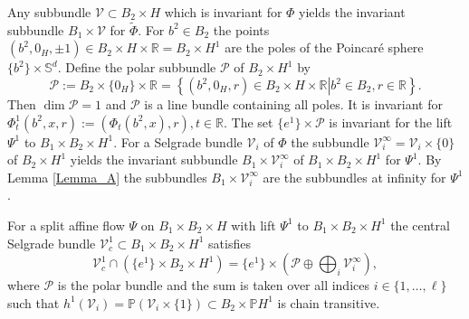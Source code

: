 	Any subbundle $\mathcal{V}\subset B_{2}\times H$ which is invariant for $\Phi$
	yields the invariant subbundle $B_{1}\times\mathcal{V}$ for $\widetilde{\Phi}%
	$. For $b^{2}\in B_{2}$ the points $(b^{2},0_{H},\pm1)\in B_{2}\times
	H\times\mathbb{R}=B_{2}\times H^{1}$ are the poles of the Poincar\'{e} sphere
	$\{b^{2}\}\times\mathbb{S}^{d}$. Define the polar subbundle $\mathcal{P}$ of
	$B_{2}\times H^{1}$ by
	\begin{equation}
		\mathcal{P}:=B_{2}\times\{0_{H}\}\times\mathbb{R}=\left\{  (b^{2},0_{H},r)\in
		B_{2}\times H\times\mathbb{R}\left\vert b^{2}\in B_{2},r\in\mathbb{R}\right.
		\right\}  . \label{P}%
	\end{equation}
	Then $\dim\mathcal{P}=1$ and $\mathcal{P}$ is a line bundle containing all
	poles. It is invariant for $\Phi_{t}^{1}(b^{2},x,r):=(\Phi_{t}(b^{2}%
	,x),r),t\in\mathbb{R}$. The set $\{e^{1}\}\times\mathcal{P}$ is invariant for
	the lift $\Psi^{1}$ to $B_{1}\times B_{2}\times H^{1}$. For a Selgrade bundle
	$\mathcal{V}_{i}$ of $\Phi$ the subbundle $\mathcal{V}_{i}^{\infty
	}=\mathcal{V}_{i}\times\{0\}$ of $B_{2}\times H^{1}$ yields the invariant
	subbundle $B_{1}\times\mathcal{V}_{i}^{\infty}$ of $B_{1}\times B_{2}\times
	H^{1}$ for $\Psi^{1}$. By Lemma \ref{Lemma_A} the subbundles $B_{1}%
	\times\mathcal{V}_{i}^{\infty}$ are the subbundles at infinity for $\Psi^{1}$.
	
	\begin{theorem}
		\label{Theorem_split}For a split affine flow $\Psi$ on $B_{1}\times
		B_{2}\times H$ with lift $\Psi^{1}$ to $B_{1}\times B_{2}\times H^{1}$ the
		central Selgrade bundle $\mathcal{V}_{c}^{1}\subset B_{1}\times B_{2}\times
		H^{1}$ satisfies
		\[
		\mathcal{V}_{c}^{1}\cap\left(  \{e^{1}\}\times B_{2}\times H^{1}\right)
		=\{e^{1}\}\times\left(  \mathcal{P}\oplus\bigoplus\nolimits_{i}\mathcal{V}
		_{i}^{\infty}\right)  ,
		\]
		where $\mathcal{P}$ is the polar bundle and the sum is taken over all indices
		$i\in\{1,\ldots,\ell\}$ such that $h^{1}(\mathcal{V}_{i})=\mathbb{P}
		(\mathcal{V}_{i}\times\{1\})\subset B_{2}\times\mathbb{P}H^{1}$ is chain transitive.
	\end{theorem}
	
